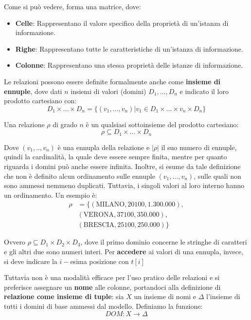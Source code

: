 \noindent Come si può vedere, forma una matrice, dove: \begin{itemize}
    \item \textbf{Celle}: Rappresentano il valore specifico della proprietà di un'istanza di informazione.
    \item \textbf{Righe}: Rappresentano tutte le caratteristiche di un'istanza di informazione.
    \item \textbf{Colonne}: Rappresentano una stessa proprietà delle istanze di informazione.
\end{itemize}

\noindent Le relazioni possono essere definite formalmente anche come \textbf{insieme di ennuple}, dove dati $n$ insiemi di valori (domini) $D_1, ...,
D_n$ e indicato il loro prodotto cartesiano con: \[
    D_1 \times ... \times D_n = \{(v_1, ..., v_n) | v_1\in D_1\times ... \times v_n\times D_n\}
\]

\noindent Una relazione $\rho$ di grado $n$ è un qualsiasi sottoinsieme del prodotto cartesiano: \[
    \rho \subseteq D_1 \times ... \times D_n
\]

\noindent Dove $(v_1, .., v_n)$ è una ennupla della relazione e $|\rho|$ il suo numero di ennuple, quindi la cardinalità, la quale deve essere sempre
finita, mentre per quanto riguarda i domini può anche essere infinita. Inoltre, si esume da tale definizione che non è definito alcun ordinamento sulle
ennuple $(v_1, ..., v_n)$, sulle quali non sono ammessi nemmeno duplicati. Tuttavia, i singoli valori al loro interno hanno un ordinamento. Un esempio è:
\begin{equation}
    \begin{split}
        \rho &= \{(\text{MILANO}, 20100, 1.300.000),\\
            & (\text{VERONA}, 37100, 350.000),\\
            & (\text{BRESCIA}, 25100, 250.000)\}
    \end{split}
\end{equation}

\noindent Ovvero $\rho\subseteq D_1\times D_2\times D_3$, dove il primo dominio concerne le stringhe di caratteri e gli altri due sono numeri interi.
Per \textbf{accedere} ai valori di una ennupla, invece, si deve indicare la $i-$esima posizione con $t[i]$\par
Tuttavia non è una modalità efficace per l'uso pratico delle relazioni e si preferisce assegnare un \textbf{nome} alle colonne, portandoci alla
definizione di \textbf{relazione come insieme di tuple}: sia $X$ un insieme di nomi e $\Delta$ l'insieme di tutti i domini di base ammessi dal
modello. Definiamo la funzione: \[
    DOM:X\to \Delta
\]

